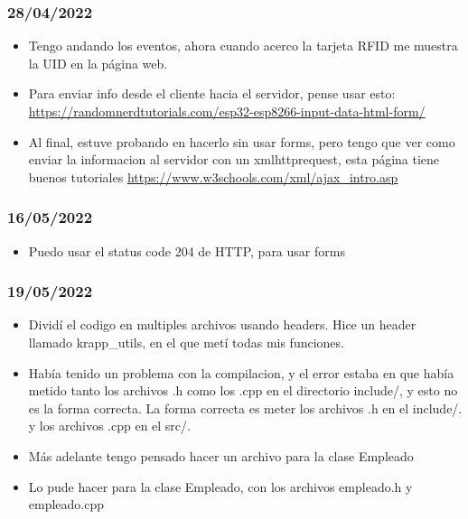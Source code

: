 \documentclass[../informe_krapp.tex]{subfiles}
\begin{document}
\subsubsection*{28/04/2022}
\begin{itemize}
	\item Tengo andando los eventos, ahora cuando acerco la tarjeta RFID me muestra
	      la UID en la página web.
	\item Para enviar info desde el cliente hacia el servidor, pense usar esto:
	      \url{https://randomnerdtutorials.com/esp32-esp8266-input-data-html-form/}
	\item Al final, estuve probando en hacerlo sin usar forms, pero
	      tengo que ver como enviar la informacion al servidor con un
	      xmlhttprequest, esta página tiene buenos tutoriales
	      \url{https://www.w3schools.com/xml/ajax_intro.asp}
\end{itemize}

\subsubsection*{16/05/2022}
\begin{itemize}
	\item Puedo usar el status code 204 de HTTP, para usar forms
\end{itemize}

\subsubsection*{19/05/2022}
\begin{itemize}
	\item Dividí el codigo en multiples archivos usando headers.
	      Hice un header llamado krapp\_utils, en el que metí todas mis funciones.
	\item Había tenido un problema con la compilacion, y el error estaba en que había metido
	      tanto los archivos .h como los .cpp en el directorio include/, y esto no es
	      la forma correcta. La forma correcta es meter los archivos .h en el include/. y
	      los archivos .cpp en el src/.
	\item Más adelante tengo pensado hacer un archivo para la clase Empleado
	\item Lo pude hacer para la clase Empleado, con los archivos empleado.h y empleado.cpp
\end{itemize}
\end{document}
